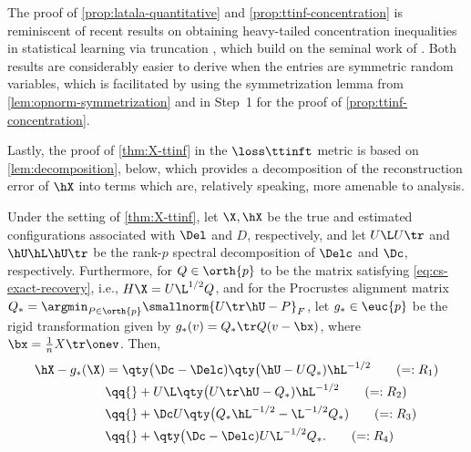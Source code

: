 \documentclass[10pt]{article}
\begin{document}
\begin{remark}
    The proof of \cref{prop:latala-quantitative} and \cref{prop:ttinf-concentration} is reminiscent of recent results on obtaining heavy-tailed concentration inequalities in statistical learning via truncation \citep[e.g.,][]{maurer2021concentration,kuchibhotla2022moving,bakhshizadeh2023sharp,klochkov2020uniform}, which build on the seminal work of \cite{nagaev1979large}. Both results are considerably easier to derive when the entries are symmetric random variables, which is facilitated by using the symmetrization lemma from \cref{lem:opnorm-symmetrization} and in Step~1 for the proof of \cref{prop:ttinf-concentration}.
\end{remark}



Lastly, the proof of \cref{thm:X-ttinf} in the $\loss\ttinft$ metric is based on \cref{lem:decomposition}, below, which provides a decomposition of the reconstruction error of $\hX$ into terms which are, relatively speaking, more amenable to analysis.




\begin{lemma}\label{lem:decomposition}
Under the setting of \cref{thm:X-ttinf}, let $\X, \hX$ be the true and estimated configurations associated with $\Del$ and $D$, respectively, and let $U \L U\tr$ and $\hU\hL\hU\tr$ be the rank-$p$ spectral decomposition of $\Delc$ and $\Dc$, respectively.
Furthermore, for $Q \in \orth{p}$ to be the matrix satisfying \cref{eq:cs-exact-recovery}, i.e., $H\X = U\L^{1/2}Q$, and for the Procrustes alignment matrix $Q_* = \argmin_{P \in \orth{p}}\smallnorm{U\tr\hU - P}_F$, let $g_* \in \euc{p}$ be the rigid transformation given by
$g_*(v) = Q_*\tr Q(v - \bx)$, where $\bx = \frac{1}{n}X\tr\onev$.
Then,
\begin{align}\label{eq:ttinf-expansion}
    \hX - g_*(\X) &= 
    \qty\big(\Dc - \Delc) \qty\big(\hU - UQ_*) \hL^{-1/2}         \tag{$=:R_1$}\\
    &\qq{}+U\L \qty\big(U\tr\hU - Q_*)\hL^{-1/2}                  \tag{$=:R_2$}\\
    &\qq{}+\Dc U \qty\big( Q_* \hL^{-1/2} - \L^{-1/2}Q_* )        \tag{$=:R_3$}\\
    &\qq{}+\qty\big(\Dc - \Delc) U \L^{-1/2}Q_*.                  \tag{$=:R_4$}
\end{align}
\end{lemma}
\end{document}
